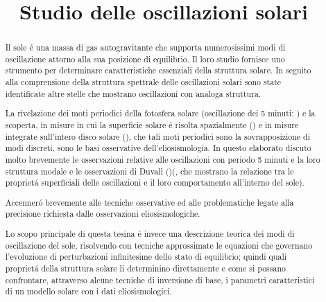 \documentclass[oneside,12pt]{memoir}
\author{ }
\title{Studio delle oscillazioni solari}
\date{}
\begin{document}
\maketitle


\tableofcontents



\frontmatter

\begin{abstract}


Il sole \'e una massa di gas autogravitante che supporta numerosissimi modi di oscillazione attorno alla sua posizione di equilibrio. Il loro studio fornisce uno strumento per determinare caratteristiche essenziali della struttura solare. In seguito alla comprensione della struttura spettrale delle oscillazioni solari sono state identificate altre stelle che mostrano oscillazioni con analoga struttura.

\begin{comment}
Analizzer\'o inizialmente le grandezze astrofisiche fondamentali, le importanti relazioni tra di esse, e le grandezze fondamentali che evidenziano i fenomeni fisici dominanti; passer\'o poi alla descrizione dei dati osservativi riguardo alle oscillazioni solari.
\end{comment}

La rivelazione dei moti periodici della fotosfera solare (oscillazione dei 5 minuti: \cite{lei62velocity}) e la scoperta, in misure in cui la superficie solare \'e risolta spazialmente (\cite{deu75observations}) e in misure integrate sull'intero disco solare (\cite{cla79solar}), che tali moti periodici sono la sovrapposizione di modi discreti, sono le basi osservative dell'eliosismologia. 
In questo elaborato discuto molto brevemente le osservazioni relative  alle oscillazioni con periodo 5 minuti e la loro struttura modale e le osservazioni di Duvall (\cite{duv82dispersion})(, che mostrano la relazione tra le propriet\'a superficiali delle oscillazioni e il loro comportamento all'interno del sole).

Accenner\'o brevemente alle tecniche osservative ed alle problematiche legate alla precisione richiesta dalle osservazioni eliosismologiche.

Lo scopo principale di questa tesina \'e invece una descrizione teorica dei modi di oscillazione del sole, risolvendo con tecniche approssimate le equazioni che governano l'evoluzione di perturbazioni infinitesime dello stato di equilibrio; quindi quali propriet\'a della struttura solare li determinino direttamente e come si possano confrontare, attraverso alcune tecniche di inversione di base, i parametri caratteristici di un modello solare con i dati eliosismologici.


\end{abstract}
\end{document}
